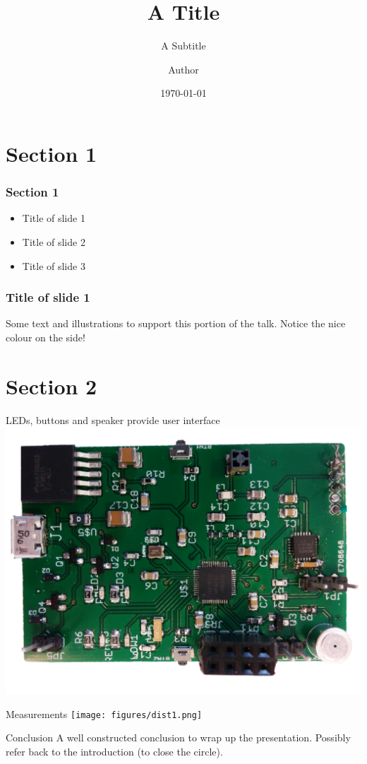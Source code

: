 \documentclass[english]{beamer}
\title{A Title}
\date{\today}
\author[Surname]{Author}
\subtitle{A Subtitle}
\newenvironment{citemize}{\begin{itemize}[label={}]\Large\setlength\itemsep{1cm}\raggedright}{\end{itemize}}
\begin{document}
\titleframe


\tocframe

\section[Small description]{Section 1}

\begin{frame} 
\frametitle{Section 1} 
\begin{citemize}
\item Title of slide 1
\item Title of slide 2
\item Title of slide 3
\end{citemize}
\end{frame}

\begin{frame} 
\frametitle{Title of slide 1 } 
Some text and illustrations to support this portion of the talk. Notice the nice colour on the side!
\end{frame}

\tocframe

\section[Another small description]{Section 2}

\begin{frame}{LEDs, buttons and speaker provide user interface}
\centering
\includegraphics[width=\linewidth,height=0.8\textheight,keepaspectratio]{figures/PCB.jpg}
\end{frame}

\tocframe

\begin{frame}{Measurements}
\centering
\texttt{[image: figures/dist1.png]}
\end{frame}

\tocframe

\begin{frame}{Conclusion}
A well constructed conclusion to wrap up the presentation. Possibly refer back to the introduction (to close the circle). 
\end{frame}

\end{document}

